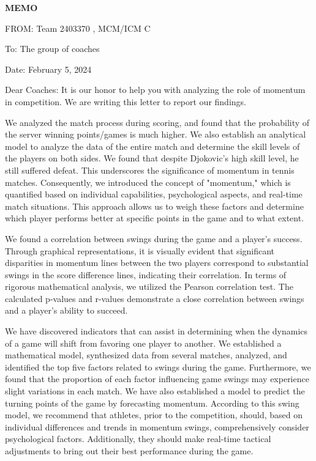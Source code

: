 \documentclass[13pt]{ctexart}
\begin{document}
\setmainfont{TeX Gyre Pagella}
\newpage
{}
\thispagestyle{empty}

{\centering \fontsize{18pt}{14pt}\selectfont \textbf{MEMO}\par}

\noindent FROM: Team {} 2403370 , MCM/ICM C

\noindent To: The group of coaches

\noindent Date: February 5, 2024

\vspace{10pt}

Dear Coaches:
It is our honor to help you with analyzing the role of momentum in competition. We are writing this letter to report our findings.

We analyzed the match process during scoring, and found that the probability of the server winning points/games is much higher. We also establish an analytical model to analyze the data of the entire match and determine the skill levels of the players on both sides. We found that despite Djokovic's high skill level, he still suffered defeat. This underscores the significance of momentum in tennis matches. Consequently, we introduced the concept of "momentum," which is quantified based on individual capabilities, psychological aspects, and real-time match situations. This approach allows us to weigh these factors and determine which player performs better at specific points in the game and to what extent.

We found a correlation between swings during the game and a player's success. Through graphical representations, it is visually evident that significant disparities in momentum lines between the two players correspond to substantial swings in the score difference lines, indicating their correlation. In terms of rigorous mathematical analysis, we utilized the Pearson correlation test. The calculated p-values and r-values demonstrate a close correlation between swings and a player's ability to succeed.

We have discovered indicators that can assist in determining when the dynamics of a game will shift from favoring one player to another. We established a mathematical model, synthesized data from several matches, analyzed, and identified the top five factors related to swings during the game. Furthermore, we found that the proportion of each factor influencing game swings may experience slight variations in each match. We have also established a model to predict the turning points of the game by forecasting momentum. According to this swing model, we recommend that athletes, prior to the competition, should, based on individual differences and trends in momentum swings, comprehensively consider psychological factors. Additionally, they should make real-time tactical adjustments to bring out their best performance during the game.
\end{document}
